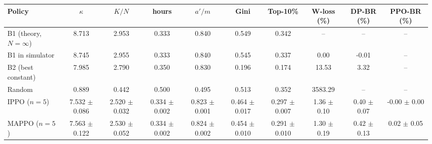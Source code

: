\begin{tabular}{lccccccccc}
\toprule
Policy & $\kappa$ & $K/N$ & hours & $a'/m$ & Gini & Top-10\% & W-loss (\%) & DP-BR (\%) & PPO-BR (\%)\\
\midrule
B1 (theory, $N{=}\infty$) & 8.713 & 2.953 & 0.333 & 0.840 & 0.549 & 0.342 & -- & -- & --\\
B1 in simulator & 8.745 & 2.955 & 0.333 & 0.840 & 0.545 & 0.337 & 0.00 & -0.01 & --\\
B2 (best constant) & 7.985 & 2.790 & 0.350 & 0.830 & 0.196 & 0.174 & 13.53 & 3.32 & --\\
Random & 0.889 & 0.442 & 0.500 & 0.495 & 0.513 & 0.352 & 3583.29 & -- & --\\
IPPO ($n{=}5$) & 7.532 $\pm$ 0.086 & 2.520 $\pm$ 0.032 & 0.334 $\pm$ 0.002 & 0.823 $\pm$ 0.001 & 0.464 $\pm$ 0.017 & 0.297 $\pm$ 0.007 & 1.36 $\pm$ 0.10 & 0.40 $\pm$ 0.07 & -0.00 $\pm$ 0.00\\
MAPPO ($n{=}5$) & 7.563 $\pm$ 0.122 & 2.530 $\pm$ 0.052 & 0.334 $\pm$ 0.002 & 0.824 $\pm$ 0.002 & 0.454 $\pm$ 0.010 & 0.291 $\pm$ 0.010 & 1.30 $\pm$ 0.19 & 0.42 $\pm$ 0.13 & 0.02 $\pm$ 0.05\\
\bottomrule
\end{tabular}
